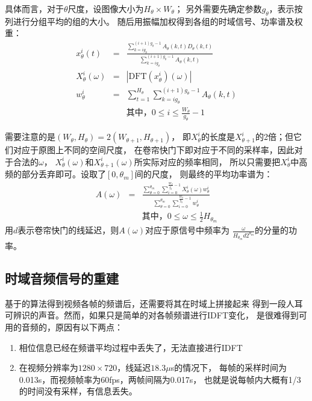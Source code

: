 具体而言，对于$\theta$尺度，设图像大小为$H_\theta \times W_\theta$；
另外需要先确定参数$g_\theta$，表示按列进行分组平均的组的大小。
随后用振幅加权得到各组的时域信号、功率谱及权重：
\begin{eqnarray}
    x_\theta^i(t) &=& \frac{\sum_{k=ig_\theta}^{(i+1)g_\theta-1}
    A_\theta(k, t)D_\theta(k, t)}
        {\sum_{k=ig_\theta}^{(i+1)g_\theta-1}A_\theta(k, t)} \\
    X_\theta^i(\omega) &=& |\text{DFT}(x_\theta^i)(\omega)| \\
    w_\theta^i &=& \sum_{t=1}^{H_\theta}
        {\sum_{k=ig_\theta}^{(i+1)g_\theta-1}A_\theta(k, t)} \\
    && \text{其中，} 0 \le i \le \frac{W_\theta}{g_\theta} - 1 \nonumber
\end{eqnarray}

需要注意的是$(W_\theta, H_\theta) = 2(W_{\theta+1}, H_{\theta+1})$，
即$X_\theta^i$的长度是$X_{\theta+1}^i$的2倍；但它们对应于原图上不同的空间尺度，
在卷帘快门下即对应于不同的采样率，因此对于合法的$\omega$，
$X_\theta^i(\omega)$和$X_{\theta+1}^i(\omega)$所实际对应的频率相同，
所以只需要把$X_\theta^i$中高频的部分丢弃即可。设取了$[0, \theta_m]$间的尺度，
则最终的平均功率谱为：
\begin{eqnarray}
    A(\omega) &=& \frac{\sum_{\theta=0}^{\theta_m}
    \sum_{i=0}^{\frac{W_\theta}{g_\theta} - 1}X_\theta^i(\omega)w_\theta^i}
    {\sum_{\theta=0}^{\theta_m}
    \sum_{i=0}^{\frac{W_\theta}{g_\theta} - 1}w_\theta^i} \\
    && \text{其中，} 0 \le \omega \le \frac{1}{2}H_{\theta_m} \nonumber
\end{eqnarray}
用$d$表示卷帘快门的线延迟，则$A(\omega)$对应于原信号中频率为
$\frac{\omega}{H_{\theta_m}d2^{\theta_m}}$的分量的功率。

\subsection{时域音频信号的重建\label{sec:global-opt}}
基于的算法得到视频各帧的频谱后，还需要将其在时域上拼接起来
得到一段人耳可辨识的声音。然而，如果只是简单的对各帧频谱进行IDFT变化，
是很难得到可用的音频的，原因有以下两点：
\begin{enumerate}
    \item 相位信息已经在频谱平均过程中丢失了，无法直接进行IDFT
    \item 在视频分辨率为$1280\times 720$，线延迟$18.3\mu$s的情况下，
        每帧的采样时间为0.013s，而视频帧率为60fps，两帧间隔为0.017s，
        也就是说每帧内大概有1/3的时间没有采样，有信息丢失。
\end{enumerate}

